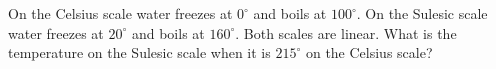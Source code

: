 On the Celsius scale water freezes at $0^\circ$ and boils at $100^\circ$. On the Sulesic scale water freezes at $20^\circ$ and boils at $160^\circ$. Both scales are linear. What is the temperature on the Sulesic scale when it is $215^\circ$ on the Celsius scale?
